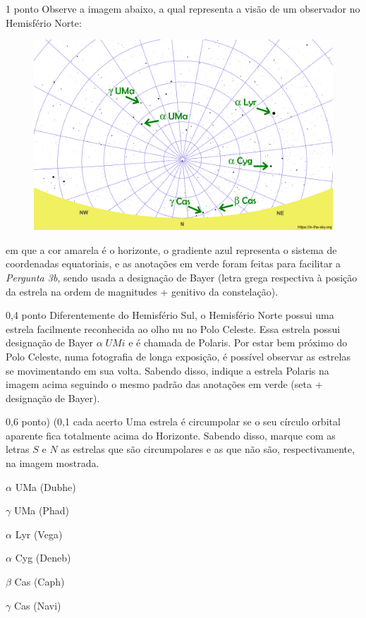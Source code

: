 \documentclass{../lista}
\begin{document}
	\begin{questao}{1 ponto}
		Observe a imagem abaixo, a qual representa a visão de um observador no Hemisfério Norte:
		\begin{figure}[H]
			\centering
			\includegraphics[scale=0.5]{./img/3.png}
		\end{figure}
		em que a cor amarela é o horizonte, o gradiente azul representa o sistema de coordenadas equatoriais, e as anotações em verde foram feitas para facilitar a \textit{Pergunta 3b}, sendo usada a designação de Bayer (letra grega respectiva à posição da estrela na ordem de magnitudes + genitivo da constelação).

		\begin{pergunta}{0,4 ponto}
			Diferentemente do Hemisfério Sul, o Hemisfério Norte possui uma estrela facilmente reconhecida ao olho nu no Polo Celeste. Essa estrela possui designação de Bayer $\alpha \; UMi$ e é chamada de Polaris. Por estar bem próximo do Polo Celeste, numa fotografia de longa exposição, é possível observar as estrelas se movimentando em sua volta. Sabendo disso, indique a estrela Polaris na imagem acima seguindo o mesmo padrão das anotações em verde (seta + designação de Bayer).
		\end{pergunta}

		\begin{pergunta}{0,6 ponto) (0,1 cada acerto}
			Uma estrela é circumpolar se o seu círculo orbital aparente fica totalmente acima do Horizonte. Sabendo disso, marque com as letras $S$ e $N$ as estrelas que são circumpolares e as que não são, respectivamente, na imagem mostrada.
			\begin{multicols}{3} \begin{alternativas}
				\item $\alpha$ UMa (Dubhe)
				\item $\gamma$ UMa (Phad)
				\item $\alpha$ Lyr (Vega)
				\item $\alpha$ Cyg (Deneb)
				\item $\beta$ Cas (Caph)
				\item $\gamma$ Cas (Navi)
			\end{alternativas} \end{multicols}
		\end{pergunta}
	\end{questao}
\end{document}
